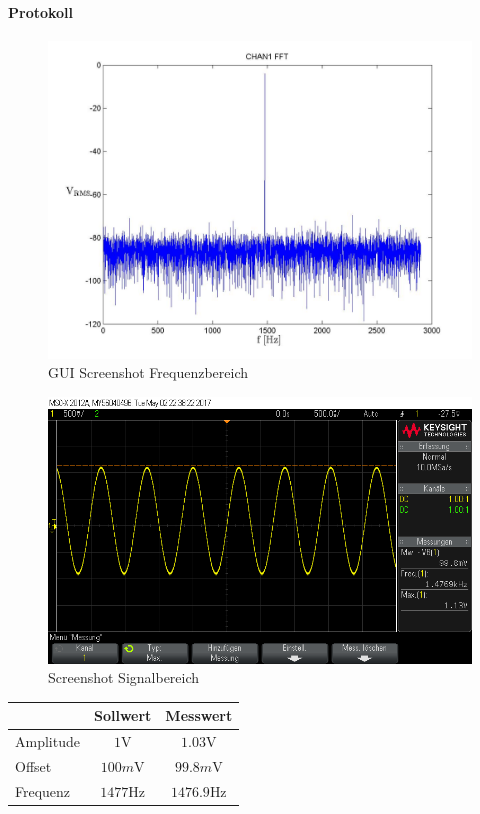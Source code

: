\documentclass[10pt]{report}
\begin{document}
        \paragraph{Protokoll}
        \begin{center}
            \begin{figure}[H]
                \includegraphics[width=\textwidth]{Screenshot_GUI_4131_FFT_chan1_fft.jpg}
              \caption{GUI Screenshot Frequenzbereich}
            \end{figure}
            \begin{figure}[H]
                \includegraphics[width=\textwidth]{Screenshot_GUI_4131_Zeit_werte.png}
              \caption{Screenshot  Signalbereich}
            \end{figure}
            \begin{tabular}{lcc}
                \toprule
                & Sollwert & Messwert\\
                \midrule
                Amplitude & $1\si{\volt}$ & $1.03\si{\volt}$\\
                Offset & $100\si{m\volt}$ & $99.8\si{m\volt}$\\
                Frequenz & $1477\si{\hertz}$ & $1476.9\si{\hertz}$\\
                \bottomrule
            \end{tabular}
        \end{center}
\end{document}
